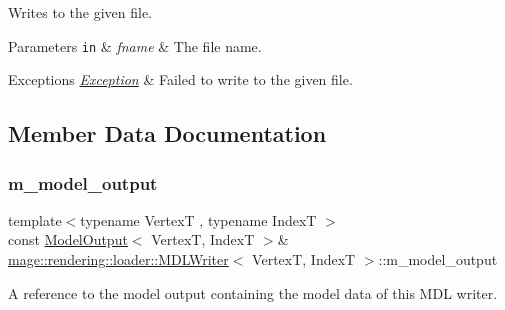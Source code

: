 Writes to the given file.


\begin{DoxyParams}[1]{Parameters}
\mbox{\tt in}  & {\em fname} & The file name. \\
\hline
\end{DoxyParams}

\begin{DoxyExceptions}{Exceptions}
{\em \mbox{\hyperlink{classmage_1_1_exception}{Exception}}} & Failed to write to the given file. \\
\hline
\end{DoxyExceptions}


\subsection{Member Data Documentation}
\mbox{\label{classmage_1_1rendering_1_1loader_1_1_m_d_l_writer_aefa6dfd7c4d7e2abe92e9c93b1e8638c}} 
\subsubsection{\texorpdfstring{m\+\_\+model\+\_\+output}{m\_model\_output}}
{\footnotesize\ttfamily template$<$typename VertexT , typename IndexT $>$ \\
const \mbox{\hyperlink{structmage_1_1rendering_1_1_model_output}{Model\+Output}}$<$ VertexT, IndexT $>$\& \mbox{\hyperlink{classmage_1_1rendering_1_1loader_1_1_m_d_l_writer}{mage\+::rendering\+::loader\+::\+M\+D\+L\+Writer}}$<$ VertexT, IndexT $>$\+::m\+\_\+model\+\_\+output\hspace{0.3cm}{\ttfamily [private]}}

A reference to the model output containing the model data of this M\+DL writer. 